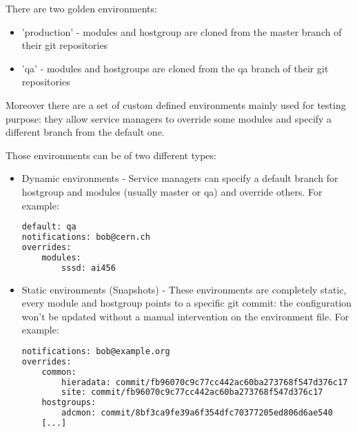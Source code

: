 There are two golden environments:

\begin{itemize}
    \item 'production' - modules and hostgroup are cloned from the master branch of
their git repositories
    \item 'qa' - modules and hostgroups are cloned from the qa branch of their git
repositories
\end{itemize}

Moreover there are a set of custom defined environments mainly used for
testing purpose: they allow service managers to override some modules and
specify a different branch from the default one.

Those environments can be of two different types:

\begin{itemize} 
    \item Dynamic environments - Service managers can specify a default branch for
hostgroup and modules (usually master or qa) and override others. For
example:

\begin{lstlisting}[language=bash, frame=single]
default: qa
notifications: bob@cern.ch
overrides:
    modules:
        sssd: ai456
\end{lstlisting}

    \item Static environments (Snapshots) - These environments are completely static,
every module and hostgroup points to a specific git commit: the
configuration won't be updated without a manual intervention on the
environment file. For example:

\begin{lstlisting}[language=bash, frame=single]
notifications: bob@example.org
overrides:
    common:
        hieradata: commit/fb96070c9c77cc442ac60ba273768f547d376c17
        site: commit/fb96070c9c77cc442ac60ba273768f547d376c17
    hostgroups:
        adcmon: commit/8bf3ca9fe39a6f354dfc70377205ed806d6ae540
    [...]
\end{lstlisting}
\end{itemize}



